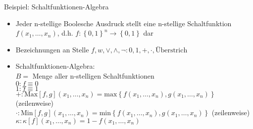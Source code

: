 \begin{frame}{Beispiel: Schaltfunktionen-Algebra}
	\begin{itemize}
		\item Jeder n-stellige Boolesche Ausdruck stellt eine n-stellige Schaltfunktion $f(x_1,\ldots,x_n)$, d.h. $f:\left\{0,1\right\}^n\rightarrow\left\{0,1\right\}$ dar
		\item Bezeichnungen an Stelle $f,w,\lor,\land,\neg:0,1,+,\cdot,\textrm{Überstrich}$
		\item Schaltfunktionen-Algebra:\\
		$B=$ Menge aller n-stelligen Schaltfunktionen\\
		$0:f\equiv 0$\\
		$1:f\equiv 1$\\
		$+:\mathrm{Max}[f,g](x_1,\ldots,x_n)=\mathrm{max}\left\{f(x_1,\ldots,x_n),g(x_1,\ldots,x_n)\right\}$ (zeilenweise)\\
		$\cdot:\mathrm{Min}[f,g](x_1,\ldots,x_n)=\mathrm{min}\left\{f(x_1,\ldots,x_n),g(x_1,\ldots,x_n)\right\}$ (zeilenweise)\\
		$\kappa : \kappa [f](x_1,\ldots,x_n)=1-f(x_1,\ldots,x_n)$
	\end{itemize}
\end{frame}


